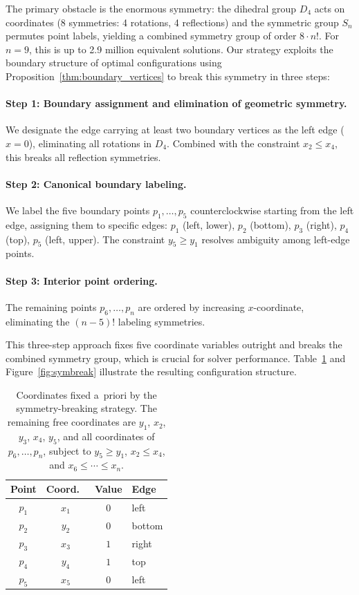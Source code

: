 \documentclass[11pt,a4paper]{article}
\theoremstyle{plain}
\theoremstyle{definition}
\theoremstyle{remark}
\begin{document}
The primary obstacle is the enormous symmetry: the dihedral group $D_4$ acts on coordinates (8 symmetries: 4 rotations, 4 reflections) and the symmetric group $S_n$ permutes point labels, yielding a combined symmetry group of order $8 \cdot n!$. For $n=9$, this is up to 2.9 million equivalent solutions. 
Our strategy exploits the boundary structure of optimal configurations using Proposition~\ref{thm:boundary_vertices} to break this symmetry in three steps:

\paragraph{Step 1: Boundary assignment and elimination of geometric symmetry.}
We designate the edge carrying at least two boundary vertices as the left edge ($x = 0$), eliminating all rotations in $D_4$. Combined with the constraint $x_2 \le x_4$, this breaks all reflection symmetries.

\paragraph{Step 2: Canonical boundary labeling.}
We label the five boundary points $p_1, \ldots, p_5$ counterclockwise starting from the left edge, assigning them to specific edges: $p_1$ (left, lower), $p_2$ (bottom), $p_3$ (right), $p_4$ (top), $p_5$ (left, upper). The constraint $y_5 \ge y_1$ resolves ambiguity among left-edge points.

\paragraph{Step 3: Interior point ordering.}
The remaining points $p_6, \ldots, p_n$ are ordered by increasing $x$-coordinate, eliminating the $(n-5)!$ labeling symmetries.

This three-step approach fixes five coordinate variables outright and breaks the combined symmetry group, which is crucial for solver performance. 
Table~\ref{tab:fixed-vars} and Figure~\ref{fig:symbreak} illustrate the resulting configuration structure.

\begin{table}[ht]
  \centering
    \begin{tabular}{c c c l}
      \toprule
      Point & Coord.\ & Value & Edge \\
      \midrule
      $p_1$ & $x_1$ & $0$ & left \\
      $p_2$ & $y_2$ & $0$ & bottom \\
      $p_3$ & $x_3$ & $1$ & right \\
      $p_4$ & $y_4$ & $1$ & top \\
      $p_5$ & $x_5$ & $0$ & left \\
      \bottomrule
    \end{tabular}
    \caption{Coordinates fixed a~priori by the symmetry-breaking strategy.
    The remaining free coordinates are $y_1$, $x_2$, $y_3$, $x_4$, $y_5$, and all coordinates of $p_6,\dots,p_n$, subject to $y_5\ge y_1$, $x_2\le x_4$, and $x_6\le\cdots\le x_n$.}
    \label{tab:fixed-vars}
\end{table}
\end{document}
